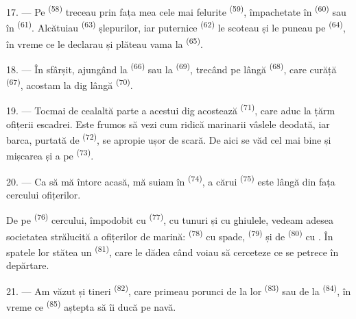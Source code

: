 17. --- Pe  \textsuperscript{(58)} treceau prin fața mea cele mai
felurite  \textsuperscript{(59)}, împachetate în 
\textsuperscript{(60)} sau în  \textsuperscript{(61)}. Alcătuiau
 \textsuperscript{(63)} șlepurilor, iar 
puternice \textsuperscript{(62)} le scoteau și le puneau pe 
\textsuperscript{(64)}, în vreme ce  le declarau și plăteau vama la
 \textsuperscript{(65)}.

18. --- În sfârșit, ajungând la  \textsuperscript{(66)} sau la
 \textsuperscript{(69)}, trecând pe lângă 
\textsuperscript{(68)}, care curăță  \textsuperscript{(67)},
acostam la dig lângă  \textsuperscript{(70)}.

19. --- Tocmai de cealaltă parte a acestui dig acostează 
\textsuperscript{(71)}, care aduc la țărm ofițerii escadrei. Este frumos să vezi
cum ridică marinarii vâslele deodată, iar barca, purtată de 
\textsuperscript{(72)}, se apropie ușor de scară. De aici se văd cel mai bine
 și mișcarea  și a  pe
 \textsuperscript{(73)}.

\VUsaut{3.0mm}
\VUsaut{3.0mm}

20. --- Ca să mă întorc acasă, mă suiam în 
\textsuperscript{(74)}, a cărui  \textsuperscript{(75)} este lângă
 din fața cercului ofițerilor.

De pe  \textsuperscript{(76)} cercului, împodobit cu
 \textsuperscript{(77)}, cu tunuri și cu ghiulele, vedeam adesea
societatea strălucită a ofițerilor de marină: 
\textsuperscript{(78)} cu spade, 
\textsuperscript{(79)} și de  \textsuperscript{(80)} cu
. În spatele lor stătea un 
\textsuperscript{(81)}, care le dădea  când voiau să cerceteze ce se
petrece în depărtare.

21. --- Am văzut și tineri  \textsuperscript{(82)}, care primeau
porunci de la  lor \textsuperscript{(83)} sau de la
 \textsuperscript{(84)}, în vreme ce 
\textsuperscript{(85)} aștepta să îi ducă pe navă.

